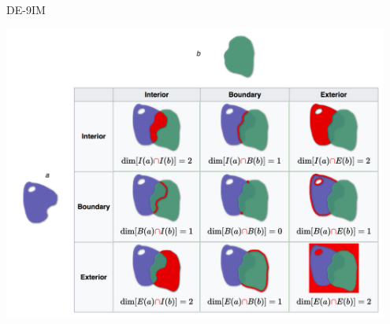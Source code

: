 \documentclass[11pt,ignorenonframetext,]{beamer}
\begin{document}
\begin{frame}{DE-9IM}
\protect\hypertarget{de-9im}{}

\begin{center}
\includegraphics[width=0.95\textwidth]{figs/de_9im.png}
\end{center}

\end{frame}
\end{document}
